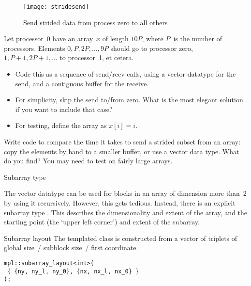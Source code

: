 \begin{figure}[t]
  \texttt{[image: stridesend]}
  \caption{Send strided data from process zero to all others}
  \label{fig:stridesend}
\end{figure}

\begin{exercise}
  \label{ex:stridesend}
  Let processor~0 have an array~$x$ of length $10P$, where $P$~is the number of processors.
  Elements $0,P,2P,\ldots,9P$ should go to processor zero, $1,P+1,2P+1,\ldots$ to processor~1,
  et cetera.
  \begin{itemize}
  \item
    Code this as a sequence of send/recv calls, using a vector datatype
    for the send, and a contiguous buffer for the receive.
  \item 
    For simplicity, skip the send to/from zero. What is the most elegant
    solution if you want to include that case?
  \item
    For testing, define the array as $x[i]=i$.
  \end{itemize}

\end{exercise}

\begin{exercise}
  Write code to compare the time it takes to send a strided subset
  from an array: copy the elements by hand to a smaller buffer, or use
  a vector data type. What do you find? You may need to test on fairly
  large arrays.
\end{exercise}

 {Subarray type}
\label{sec:type_subarray}

The vector datatype can be used for blocks in an array of dimension
more than~2 by using it recursively. However, this gets
tedious. Instead, there is an explicit subarray type
%
.
%
This describes the dimensionality and extent of the array, and
the starting point (the `upper left corner') and extent of the
subarray.

\begin{mplnote}{Subarray layout}
  The templated  class is constructed
  from a vector of triplets of global size~/ subblock size~/ first coordinate.
\begin{lstlisting}
mpl::subarray_layout<int>( 
 { {ny, ny_l, ny_0}, {nx, nx_l, nx_0} }
);  
\end{lstlisting}
\end{mplnote}

